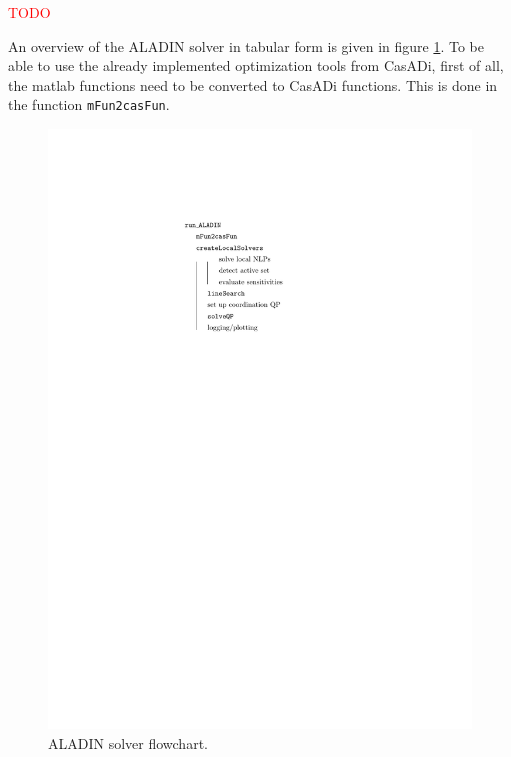 \documentclass[]{scrartcl}
\begin{document}
\textcolor{red}{TODO}

 An overview of the ALADIN solver in tabular form is given in figure \ref{fig:flowchart}. To be able to use the already implemented optimization tools from CasADi, first of all, the matlab functions need to be converted to CasADi functions. This is done in the function \texttt{mFun2casFun}. 
\begin{figure}[htb]
	\centering
	\includegraphics[width=0.3\linewidth]{figures/flowChart}
	\caption{ALADIN solver flowchart.}
	\label{fig:flowchart}
\end{figure}
\end{document}
